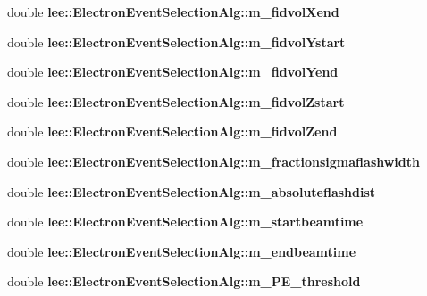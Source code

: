 \begin{DoxyCompactItemize}
\item 
\hypertarget{group__lee_ga96a39585eb1cc6296f39fe20c411487b}{double {\bfseries lee\-::\-Electron\-Event\-Selection\-Alg\-::m\-\_\-fidvol\-Xend}}\label{group__lee_ga96a39585eb1cc6296f39fe20c411487b}

\item 
\hypertarget{group__lee_ga619e14aa36bea7cb4a1cda1af59e874c}{double {\bfseries lee\-::\-Electron\-Event\-Selection\-Alg\-::m\-\_\-fidvol\-Ystart}}\label{group__lee_ga619e14aa36bea7cb4a1cda1af59e874c}

\item 
\hypertarget{group__lee_gaa068d7654b2c313f37e6acca55d7cbde}{double {\bfseries lee\-::\-Electron\-Event\-Selection\-Alg\-::m\-\_\-fidvol\-Yend}}\label{group__lee_gaa068d7654b2c313f37e6acca55d7cbde}

\item 
\hypertarget{group__lee_ga947ab1201c69fc7ffcfd3eb6720a7912}{double {\bfseries lee\-::\-Electron\-Event\-Selection\-Alg\-::m\-\_\-fidvol\-Zstart}}\label{group__lee_ga947ab1201c69fc7ffcfd3eb6720a7912}

\item 
\hypertarget{group__lee_ga6971785950632dd5afc288142aee39f6}{double {\bfseries lee\-::\-Electron\-Event\-Selection\-Alg\-::m\-\_\-fidvol\-Zend}}\label{group__lee_ga6971785950632dd5afc288142aee39f6}

\item 
\hypertarget{group__lee_gac32ee2582a0e2b1e61e1877bd00da44a}{double {\bfseries lee\-::\-Electron\-Event\-Selection\-Alg\-::m\-\_\-fractionsigmaflashwidth}}\label{group__lee_gac32ee2582a0e2b1e61e1877bd00da44a}

\item 
\hypertarget{group__lee_gae16d1fff36b6960e4098741e251af01c}{double {\bfseries lee\-::\-Electron\-Event\-Selection\-Alg\-::m\-\_\-absoluteflashdist}}\label{group__lee_gae16d1fff36b6960e4098741e251af01c}

\item 
\hypertarget{group__lee_gaeeb5023e8512933602d4347d1e1b7359}{double {\bfseries lee\-::\-Electron\-Event\-Selection\-Alg\-::m\-\_\-startbeamtime}}\label{group__lee_gaeeb5023e8512933602d4347d1e1b7359}

\item 
\hypertarget{group__lee_ga0a4427349f2c202218e71dc8119ad811}{double {\bfseries lee\-::\-Electron\-Event\-Selection\-Alg\-::m\-\_\-endbeamtime}}\label{group__lee_ga0a4427349f2c202218e71dc8119ad811}

\item 
\hypertarget{group__lee_ga5125eb3abd5356cd0c33e9f47f2c6a3d}{double {\bfseries lee\-::\-Electron\-Event\-Selection\-Alg\-::m\-\_\-\-P\-E\-\_\-threshold}}\label{group__lee_ga5125eb3abd5356cd0c33e9f47f2c6a3d}


\end{DoxyCompactItemize}
